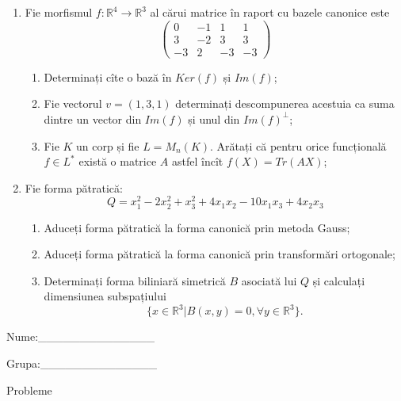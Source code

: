 \documentclass{article}
\begin{document}
\begin{enumerate}
 \item Fie morfismul $f:\mathbb{R}^4 \to \mathbb{R}^3$ al cărui matrice în raport cu bazele canonice este
$$\begin{pmatrix}
0&-1&1&1\\
3&-2&3&3\\
-3&2&-3&-3
\end{pmatrix}$$

\begin{enumerate}
\item Determinați cîte o bază în $Ker(f)$ și $Im(f)$;
\item Fie vectorul $v=(1,3,1)$ determinați descompunerea acestuia ca suma dintre un vector din $Im(f)$ și unul din $Im(f)^\perp$;
\item Fie $K$ un corp și fie $L=M_n(K)$. Arătați că pentru orice funcțională $f \in L^*$ există o matrice $A$ astfel încît $f(X)=Tr(AX)$;
\end{enumerate}
\item Fie forma pătratică:
$$Q= x_1^2-2x_2^2+x_3^2+4x_1x_2-10x_1x_3+4x_2x_3$$

\begin{enumerate}
\item Aduceți forma pătratică la forma canonică prin metoda Gauss;
\item Aduceți forma pătratică la forma canonică prin transformări ortogonale;
\item Determinați forma biliniară simetrică $B$ asociată lui $Q$ și calculați dimensiunea subspațiului
$$\{x \in \mathbb{R}^3 | B(x,y)=0,\forall y \in \mathbb{R}^3\}.$$

\end{enumerate}
\end{enumerate}
\newpage
\begin{flushright}
Nume:\_\_\_\_\_\_\_\_\_\_\_\_\_\_
 
 
Grupa:\_\_\_\_\_\_\_\_\_\_\_\_\_\_
\end{flushright}
\begin{center}
\vspace{2cm}
{\Large Probleme}
\vspace{2cm}
\end{center}
\end{document}
